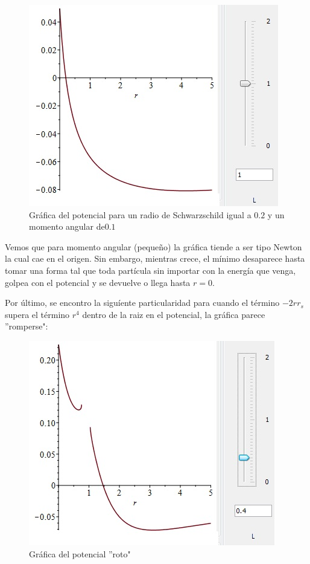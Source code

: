 \documentclass{article}
\begin{document}
\begin{figure}[H]
\centering
\includegraphics[scale=0.7]{rs=02,L=1.jpg}  \caption{Gráfica del potencial para un radio de Schwarzschild igual a $0.2$ y un momento angular de$0.1$}\label{1}
\end{figure}

Vemos que para momento angular (pequeño) la gráfica tiende a ser tipo Newton la cual cae en el origen. Sin embargo, mientras crece, el mínimo desaparece hasta tomar una forma tal que toda partícula sin importar con la energía que venga, golpea con el potencial y se devuelve o llega hasta $r=0$.

Por último, se encontro la siguíente particularidad para cuando el término $-2r r_s$ supera el término $r^4$ dentro de la raiz en el potencial, la gráfica parece ''romperse":

\begin{figure}[H]
\centering
\includegraphics[scale=0.7]{mistake.jpg}  \caption{Gráfica del potencial ''roto"}\label{m}
\end{figure}
\end{document}
